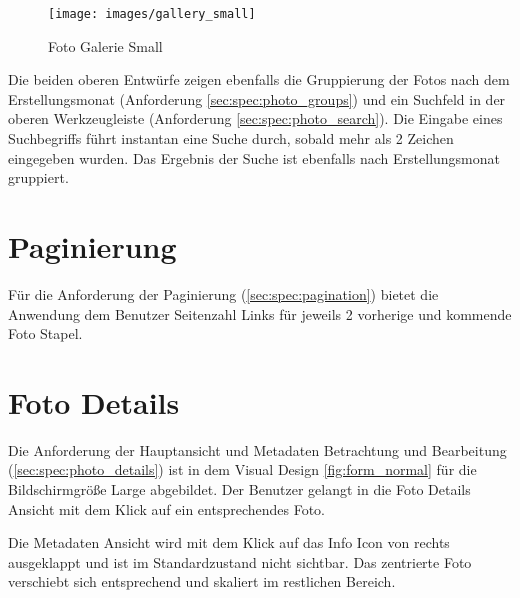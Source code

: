 \begin{figure}[htp]     %
\centering
\texttt{[image: images/gallery\_small]} 
\caption{Foto Galerie Small}\label{fig:gallery_small}
\end{figure}

Die beiden oberen Entwürfe zeigen ebenfalls die Gruppierung der Fotos nach dem Erstellungsmonat (Anforderung \ref{sec:spec:photo_groups}) und ein Suchfeld in der oberen Werkzeugleiste (Anforderung \ref{sec:spec:photo_search}). Die Eingabe eines Suchbegriffs führt instantan eine Suche durch, sobald mehr als 2 Zeichen eingegeben wurden. Das Ergebnis der Suche ist ebenfalls nach Erstellungsmonat gruppiert.

\section{Paginierung}

Für die Anforderung der Paginierung (\ref{sec:spec:pagination}) bietet die Anwendung dem Benutzer Seitenzahl Links für jeweils 2 vorherige und kommende Foto Stapel.


\section{Foto Details}
Die Anforderung der Hauptansicht und Metadaten Betrachtung und Bearbeitung (\ref{sec:spec:photo_details}) ist in dem Visual Design \ref{fig:form_normal} für die Bildschirmgröße Large abgebildet. Der Benutzer gelangt in die Foto Details Ansicht mit dem Klick auf ein entsprechendes Foto. 

Die Metadaten Ansicht wird mit dem Klick auf das Info Icon von rechts ausgeklappt und ist im Standardzustand nicht sichtbar. Das zentrierte Foto verschiebt sich entsprechend und skaliert im restlichen Bereich.


